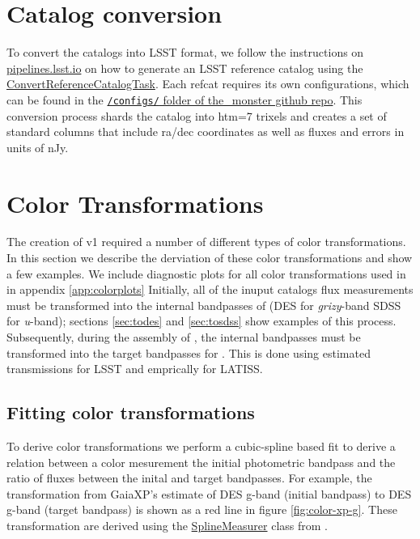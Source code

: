 \section{Catalog conversion}
\label{sec:conversion}
To convert the catalogs into LSST format, we follow the instructions on \href{https://pipelines.lsst.io/modules/lsst.meas.algorithms/creating-a-reference-catalog.html}{pipelines.lsst.io} on how to generate an LSST reference catalog using the \href{https://pipelines.lsst.io/modules/lsst.meas.algorithms/tasks/lsst.meas.algorithms.ConvertReferenceCatalogTask.html#lsst-task-lsst-meas-algorithms-convertreferencecatalog-convertreferencecatalogtask}{ConvertReferenceCatalogTask}. Each refcat requires its own configurations, which can be found in the \href{https://github.com/lsst-dm/the_monster/tree/main/configs}{\texttt{/configs/} folder of the\_monster github repo}.
This conversion process shards the catalog into htm=7 trixels and creates a set of standard columns that include ra/dec coordinates as well as fluxes and errors in units of nJy.

\section{Color Transformations}
\label{sec:colors}
The creation of \monster v1 required a number of different types of color transformations. 
In this section we describe the derviation of these color transformations and show a few examples. 
We include diagnostic plots for all color transformations used in \monster in appendix \ref{app:colorplots}
Initially, all of the inuput catalogs flux measurements must be transformed into the internal bandpasses of \monster (DES for \emph{grizy}-band SDSS for \emph{u}-band); sections \ref{sec:todes} and \ref{sec:tosdss} show examples of this process. 
Subsequently, during the assembly of \monster, the internal bandpasses must be transformed into the target bandpasses for \monster. 
This is done using estimated transmissions for LSST and emprically for LATISS. 


\subsection{Fitting color transformations}
To derive color transformations we perform a cubic-spline based fit to derive a relation between a color mesurement the initial photometric bandpass and the ratio of fluxes between the inital and target bandpasses.
For example, the transformation from GaiaXP's estimate of DES g-band (initial bandpass) to DES g-band (target bandpass) is shown as a red line in figure \ref{fig:color-xp-g}. 
These transformation are derived using the \href{https://github.com/lsst-dm/the_monster/blob/main/python/lsst/the/monster/measure_colorterms.py}{SplineMeasurer} class from \monster. 

